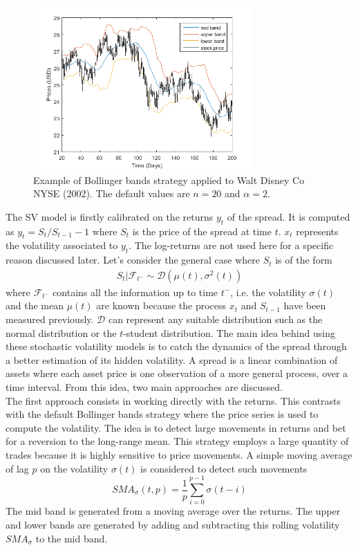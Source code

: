 \documentclass[11pt,a4,twosided,singlespacing,titlepagenumber=on]{scrreprt}
\numberwithin{equation}{chapter} %
\theoremstyle{remark}
\begin{document}
\begin{figure}[H]
\centering
\includegraphics[width = 0.75\textwidth]{bollinger_bands_intro}
\caption{Example of Bollinger bands strategy applied to Walt Disney Co NYSE (2002). The default values are $n = 20$ and $\alpha = 2$.}
\label{bollinger_bands_intro}
\end{figure}

The SV model is firstly calibrated on the returns $y_t$ of the spread. It is computed as $y_t = S_t / S_{t-1}-1$ where $S_t$ is the price of the spread at time $t$.
$x_t$ represents the volatility associated to $y_t$. The log-returns are not used here for a specific reason discussed later. Let's consider the general case where $S_t$ is of the form
\begin{align*}
S_t | \mathcal{F}_{t^-} \sim \mathcal{D}\left( \mu(t), \sigma^2(t) \right)
\end{align*}
where $\mathcal{F}_{t^-}$ contains all the information up to time $t^-$, i.e. the volatility $\sigma(t)$ and the mean $\mu(t)$ are known because the process $x_t$ and $S_{t-1}$ have been measured previously. $\mathcal{D}$ can represent any suitable distribution such as the normal distribution or the $t$-student distribution.
The main idea behind using these stochastic volatility models is to catch the dynamics of the spread through a better estimation of its hidden volatility. A spread is a linear combination of assets where each asset price is one observation of a more general process, over a time interval. From this idea, two main approaches are discussed. \\


The first approach consists in working directly with the returns. This contrasts with the default Bollinger bands strategy where the price series is used to compute the volatility. The idea is to detect large movements in returns and bet for a reversion to the long-range mean. This strategy employs a large quantity of trades because it is highly sensitive to price movements. A simple moving average of lag $p$ on the volatility $\sigma(t)$ is considered to detect such movements
\begin{equation}
SMA_\sigma(t, p) = \frac{1}{p} \sum_{i=0}^{p-1}\sigma(t-i)
\end{equation}
The mid band is generated from a moving average over the returns. The upper and lower bands are generated by adding and subtracting this rolling volatility $SMA_\sigma$ to the mid band. \\
\end{document}
